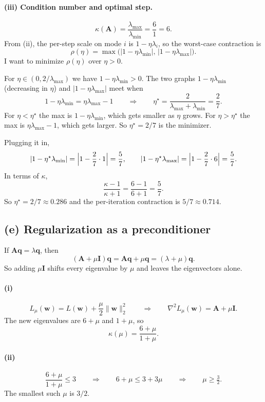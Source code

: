 \documentclass[11pt]{article}
\newcommand{\vct}[1]{\mathbf{#1}}
\newcommand{\mat}[1]{\mathbf{#1}}
\begin{document}
\paragraph{(iii) Condition number and optimal step.}
\[
\kappa(\mat{A}) = \frac{\lambda_{\max}}{\lambda_{\min}} = \frac{6}{1} = 6.
\]
From (ii), the per-step scale on mode \(i\) is \(1-\eta\lambda_i\), so the
worst-case contraction is
\[
\rho(\eta)
= \max\bigl(|1-\eta\lambda_{\min}|,\,|1-\eta\lambda_{\max}|\bigr).
\]
I want to minimize \(\rho(\eta)\) over \(\eta>0\).

For \(\eta\in(0,2/\lambda_{\max})\) we have \(1-\eta\lambda_{\min}>0\). The
two graphs \(1-\eta\lambda_{\min}\) (decreasing in \(\eta\)) and
\(|1-\eta\lambda_{\max}|\) meet when
\[
1-\eta\lambda_{\min} = \eta\lambda_{\max}-1
\qquad\Rightarrow\qquad
\eta^\star = \frac{2}{\lambda_{\max}+\lambda_{\min}} = \frac{2}{7}.
\]
For \(\eta<\eta^\star\) the max is \(1-\eta\lambda_{\min}\), which gets
smaller as \(\eta\) grows. For \(\eta>\eta^\star\) the max is
\(\eta\lambda_{\max}-1\), which gets larger. So \(\eta^\star=2/7\) is the
minimizer.

Plugging it in,
\[
|1-\eta^\star\lambda_{\min}|
= \Bigl|1-\frac{2}{7}\cdot 1\Bigr|
= \frac57,
\qquad
|1-\eta^\star\lambda_{\max}|
= \Bigl|1-\frac{2}{7}\cdot 6\Bigr|
= \frac57.
\]
In terms of \(\kappa\),
\[
\frac{\kappa-1}{\kappa+1} = \frac{6-1}{6+1} = \frac57.
\]
So \(\eta^\star=2/7\approx 0.286\) and the per-iteration contraction is
\(5/7\approx 0.714\).

\subsection*{(e) Regularization as a preconditioner}

If \(\mat{A}\vct{q}=\lambda\vct{q}\), then
\[
(\mat{A}+\mu\mat{I})\vct{q}
= \mat{A}\vct{q}+\mu\vct{q}
= (\lambda+\mu)\vct{q}.
\]
So adding \(\mu\mat{I}\) shifts every eigenvalue by \(\mu\) and leaves the
eigenvectors alone.

\paragraph{(i)}
\[
L_\mu(\vct{w})
= L(\vct{w}) + \frac{\mu}{2}\|\vct{w}\|_2^2
\qquad\Rightarrow\qquad
\nabla^2 L_\mu(\vct{w})
= \mat{A}+\mu\mat{I}.
\]
The new eigenvalues are \(6+\mu\) and \(1+\mu\), so
\[
\kappa(\mu) = \frac{6+\mu}{1+\mu}.
\]

\paragraph{(ii)}
\[
\frac{6+\mu}{1+\mu} \le 3
\qquad\Rightarrow\qquad
6+\mu \le 3+3\mu
\qquad\Rightarrow\qquad
\mu \ge \tfrac32.
\]
The smallest such \(\mu\) is \(3/2\).
\end{document}
